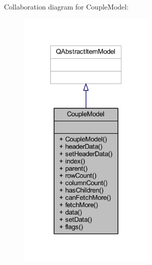 Collaboration diagram for Couple\+Model\+:
\nopagebreak
\begin{figure}[H]
\begin{center}
\leavevmode
\includegraphics[width=186pt]{class_couple_model__coll__graph}
\end{center}
\end{figure}
